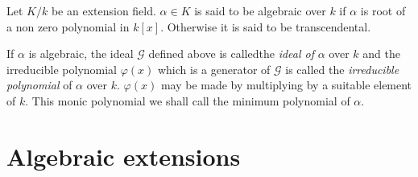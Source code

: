 \begin{defi*}
 Let $K/k$ be an extension field. $\alpha \in K$ is said to be
  algebraic over $k$ if $\alpha$ is root of a non zero polynomial in
  $k[x]$. Otherwise it is said to be transcendental. 
  
If $\alpha$ is algebraic, the ideal $\mathscr{G}$ defined above is
called\pageoriginale the \textit{ideal of} $\alpha$ over $k$ and the
irreducible 
polynomial $\varphi(x)$ which  is a generator of $\mathscr{G}$ is
called the \textit{irreducible polynomial} of $\alpha$ over
$k$. $\varphi(x)$ may be made by multiplying by a suitable element of
$k$. This monic polynomial we shall call the minimum polynomial of
$\alpha$. 
\end{defi*}

\section{Algebraic extensions}\label{c1:s3}%

